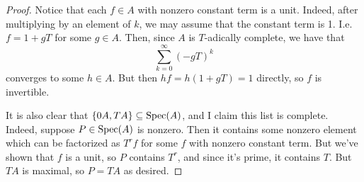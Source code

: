 \begin{proof}
	Notice that each $f \in A$ with nonzero constant term is a unit. Indeed, after multiplying by an element of $k$, we may assume that the constant term is 1. I.e. $f = 1 + gT$ for some $g \in A$. Then, since $A$ is $T$-adically complete, we have that
	\[ \sum_{k=0}^\infty (-gT)^k \]
	converges to some $h \in A$. But then $hf = h(1+gT) = 1$ directly, so $f$ is invertible.
	
	It is also clear that $\{0A, TA\} \subseteq \operatorname{Spec}(A)$, and I claim this list is complete. Indeed, suppose $P \in \operatorname{Spec}(A)$ is nonzero. Then it contains some nonzero element which can be factorized as $T^rf$ for some $f$ with nonzero constant term. But we've shown that $f$ is a unit, so $P$ contains $T^r$, and since it's prime, it contains $T$. But $TA$ is maximal, so $P = TA$ as desired.
\end{proof}
